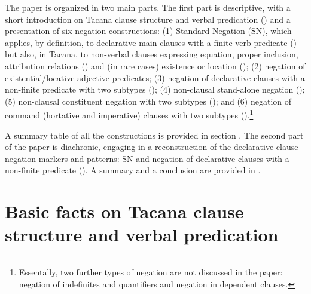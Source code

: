 \documentclass[output=paper]{langsci/langscibook}
\begin{document}
The paper is organized in two main parts. The first part is descriptive,
with a short introduction on Tacana clause structure and verbal predication
() and a presentation of six negation constructions:
(1) Standard Negation (SN), which applies, by definition, to
declarative main clauses with a finite verb predicate
\parencite{Miestamo2005}
() but also, in Tacana, to non-verbal clauses
expressing equation, proper inclusion,
attribution relations () and (in rare cases)
existence or location (); 
(2) negation of existential\slash loca\-ti\-ve adjective
predicates;
(3) negation of declarative clauses with a non-finite
predicate with two subtypes ();
(4) non-clausal stand-alone negation
(); 
(5) non-clausal constituent negation with two subtypes (); and
(6) negation of command (hortative and imperative) clauses with
two subtypes ().\footnote{Essentally, two further
types of negation are not discussed in the paper: negation of indefinites
and quantifiers and negation in dependent clauses.} 

A summary table of all the constructions is provided in section
. The second part
of the paper is diachronic, engaging in a reconstruction of the
declarative clause negation markers and patterns: SN and negation of
declarative clauses with a non-finite predicate ().
A summary and a conclusion are provided in .

\section{Basic facts on Tacana clause structure and verbal predication}%
\label{sec:tacana-2}
\end{document}
